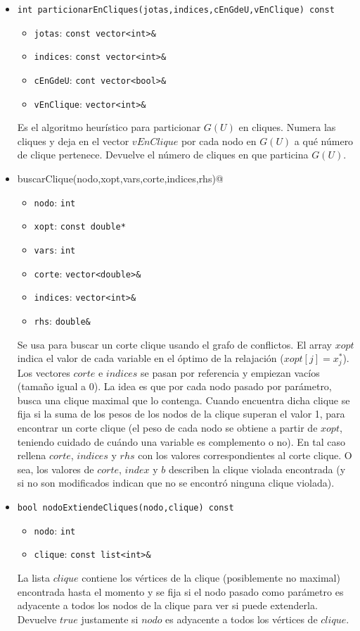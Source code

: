 \begin{itemize}
\item \verb_int particionarEnCliques(jotas,indices,cEnGdeU,vEnClique) const_
	\begin{itemize}
	\item \verb_jotas_: \verb_const vector<int>&_
	\item \verb_indices_: \verb_const vector<int>&_
	\item \verb_cEnGdeU_: \verb_cont vector<bool>&_
	\item \verb_vEnClique_: \verb_vector<int>&_
	\end{itemize}
Es el algoritmo heur\'istico para particionar $G(U)$ en cliques. Numera las cliques y deja en el vector $vEnClique$ por cada nodo en $G(U)$ a qu\'e n\'umero de clique pertenece. Devuelve el n\'umero de cliques en que particina $G(U)$.

\item \verb@void buscarClique(nodo,xopt,vars,corte,indices,rhs)@
	\begin{itemize}
	\item \verb_nodo_: \verb_int_
	\item \verb_xopt_: \verb_const double*_
	\item \verb_vars_: \verb_int_
	\item \verb_corte_: \verb_vector<double>&_
	\item \verb_indices_: \verb_vector<int>&_
	\item \verb_rhs_: \verb_double&_
	\end{itemize}
Se usa para buscar un corte clique usando el grafo de conflictos. El array $xopt$ indica el valor de cada variable en el óptimo de la relajación ($xopt[j]=x^*_j$). Los vectores $corte$ e $indices$ se pasan por referencia y empiezan vacíos (tamaño igual a 0). La idea es que por cada nodo pasado por par\'ametro, busca una clique maximal que lo contenga. Cuando encuentra dicha clique se fija si la suma de los pesos de los nodos de la clique superan el valor 1, para encontrar un corte clique (el peso de cada nodo se obtiene a partir de $xopt$, teniendo cuidado de cuándo una variable es complemento o no). En tal caso rellena $corte$, $indices$ y $rhs$ con los valores correspondientes al corte clique. O sea, los valores de $corte$, $index$ y $b$ describen la clique violada encontrada (y si no son modificados indican que no se encontró ninguna clique violada).

\item \verb_bool nodoExtiendeCliques(nodo,clique) const_
	\begin{itemize}
	\item \verb_nodo_: \verb_int_
	\item \verb_clique_: \verb_const list<int>&_
	\end{itemize}
La lista $clique$ contiene los v\'ertices de la clique (posiblemente no maximal) encontrada hasta el momento y se fija si el nodo pasado como par\'ametro es adyacente a todos los nodos de la clique para ver si puede extenderla. Devuelve $true$ justamente si $nodo$ es adyacente a todos los v\'ertices de $clique$.

\end{itemize}
